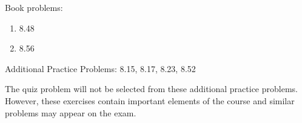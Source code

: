 
Book problems:
\begin{enumerate}
  \item 8.48
  \item 8.56
\end{enumerate}

Additional Practice Problems: 8.15, 8.17, 8.23, 8.52

\noindent The quiz problem will not be selected from these additional practice problems.  However, these exercises contain important elements of the course and similar problems may appear on the exam.

\iftoggle{flagSoln}{%
\vspace{.5cm}
\rule{\textwidth}{.4pt}
\vspace{.5cm}
\textbf{Solution:}
\begin{enumerate}
  \item[8.48] (a) 283 N to left, (b) $B_x = 413 N$ to left, (c) $B_y = 480 N$ down
  \item[8.56] (a) $28.1^\circ$, (b) 728 N at $14.04^\circ$ up and to the right from the horizontal
  \item[8.15] For impending tipping, the reaction is at C.  And being a 3-force body, the reaction must pass through the intersection of $P$ and $W$. (a) $\mu_s = 0.485$ (found by solving for $\phi_s$) (b) $P = 255 N$
\end{enumerate}
}{%
}%
